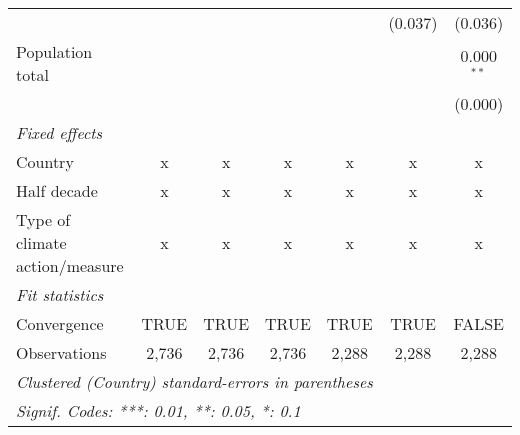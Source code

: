 \begin{tabular}{lcccccc}
                                                      &               &               &               &               & (0.037)       & (0.036)\\   
   Population total                                   &               &               &               &               &               & 0.000$^{**}$\\   
                                                      &               &               &               &               &               & (0.000)\\   
   \emph{Fixed effects}\\
   Country                                            & x             & x             & x             & x             & x             & x\\  
   Half decade                                        & x             & x             & x             & x             & x             & x\\  
   Type of climate action/measure                     & x             & x             & x             & x             & x             & x\\  
   \midrule \emph{Fit statistics}\\
   Convergence                                        &TRUE           & TRUE          & TRUE          & TRUE          & TRUE          & FALSE\\  
   Observations                                       & 2,736         & 2,736         & 2,736         & 2,288         & 2,288         & 2,288\\  
   \midrule
   \multicolumn{7}{l}{\emph{Clustered (Country) standard-errors in parentheses}}\\
   \multicolumn{7}{l}{\emph{Signif. Codes: ***: 0.01, **: 0.05, *: 0.1}}\\
\end{tabular}
\par\endgroup


